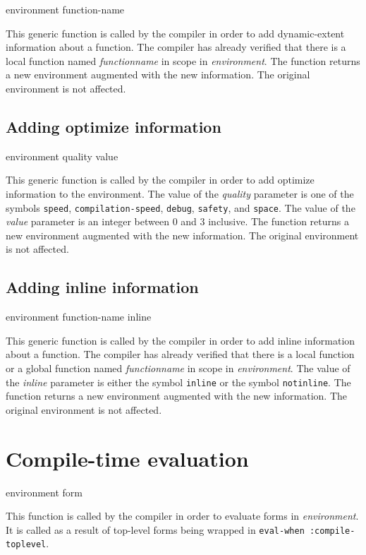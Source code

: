  {environment function-name}

This generic function is called by the compiler in order to add
dynamic-extent information about a function.  The compiler has already
verified that there is a local function named \textit{functionname} in
scope in \textit{environment}.  The function returns a new environment
augmented with the new information.  The original environment is not
affected.

\subsection{Adding optimize information}

 {environment quality value}

This generic function is called by the compiler in order to add
optimize information to the environment.  The value of the
\textit{quality} parameter is one of the symbols \texttt{speed},
\texttt{compilation-speed}, \texttt{debug}, \texttt{safety}, and
\texttt{space}.  The value of the \textit{value} parameter is an
integer between $0$ and $3$ inclusive.  The function returns a new
environment augmented with the new information.  The original
environment is not affected.

\subsection{Adding inline information}

 {environment function-name inline}

This generic function is called by the compiler in order to add inline
information about a function.  The compiler has already verified that
there is a local function or a global function named
\textit{functionname} in scope in \textit{environment}.  The value of
the \textit{inline} parameter is either the symbol \texttt{inline} or
the symbol \texttt{notinline}.  The function returns a new environment
augmented with the new information.  The original environment is not
affected.

\section{Compile-time evaluation}
\label{sec-environment-compile-time-evaluation}

 {environment form}

This function is called by the compiler in order to evaluate forms in
\textit{environment}.  It is called as a result of top-level forms
being wrapped in \texttt{eval-when :compile-toplevel}. 

